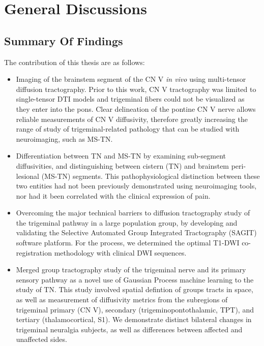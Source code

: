 \graphicspath{{images/discussions/}}

\chapter{General Discussions}

\section{Summary Of Findings}

The contribution of this thesis are as follows:

\begin{itemize}

\item Imaging of the brainstem segment of the CN V \textit{in vivo} using multi-tensor diffusion tractography. Prior to this work, CN V tractography was limited to single-tensor DTI models and trigeminal fibers could not be visualized as they enter into the pons. Clear delineation of the pontine CN V nerve allows reliable measurements of CN V diffusivity, therefore greatly increasing the range of study of trigeminal-related pathology that can be studied with neuroimaging, such as MS-TN. 

\item Differentiation between TN and MS-TN by examining sub-segment diffusivities, and distinguishing between cistern (TN) and brainstem peri-lesional (MS-TN) segments. This pathophysiological distinction between these two entities had not been previously demonstrated using neuroimaging tools, nor had it been correlated with the clinical expression of pain. 

\item Overcoming the major technical barriers to diffusion tractography study of the trigeminal pathway in a large population group, by developing and validating the Selective Automated Group Integrated Tractography (SAGIT) software platform. For the process, we determined the optimal T1-DWI co-registration methodology with clinical DWI sequences.

\item Merged group tractography study of the trigeminal nerve and its primary sensory pathway as a novel use of Gaussian Process machine learning to the study of TN. This study involved spatial defintion of groups tracts in space, as well as measurement of diffusivity metrics from the subregions of trigeminal primary (CN V), secondary (trigeminopontothalamic, TPT), and tertiary (thalamocortical, S1). We demonstrate distinct bilateral changes in trigeminal neuralgia subjects, as well as differences between affected and unaffected sides. 

\end{itemize}

